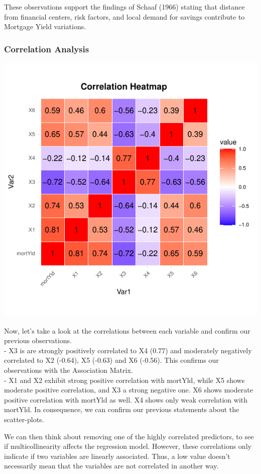 \documentclass[
  11pt,
]{article}
\begin{document}
These observations support the findings of Schaaf (1966) stating that
distance from financial centers, risk factors, and local demand for
savings contribute to Mortgage Yield variations.\\

\subsubsection{Correlation Analysis}\label{correlation-analysis}

\includegraphics{Figs/unnamed-chunk-7-1.pdf}

Now, let's take a look at the correlations between each variable and
confirm our previous observations.\\
- X3 is are strongly positively correlated to X4 (0.77) and moderately
negatively correlated to X2 (-0.64), X5 (-0.63) and X6 (-0.56). This
confirms our observations with the Association Matrix.\\
- X1 and X2 exhibit strong positive correlation with mortYld, while X5
shows moderate positive correlation, and X3 a strong negative one. X6
shows moderate positive correlation with mortYld as well. X4 shows only
weak correlation with mortYld. In consequence, we can confirm our
previous statements about the scatter-plots.

We can then think about removing one of the highly correlated
predictors, to see if multicollinearity affects the regression model.
However, these correlations only indicate if two variables are linearly
associated. Thus, a low value doesn't necessarily mean that the
variables are not correlated in another way.
\end{document}
